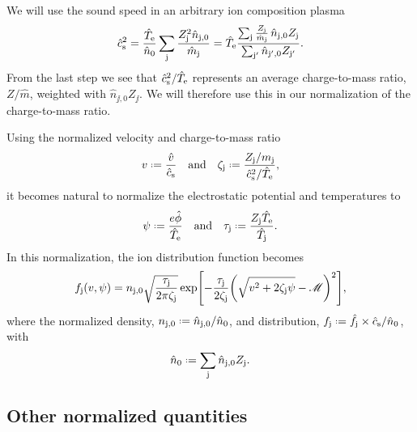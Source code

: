 \documentclass[11pt,a4paper, 
swedish, english %
]{article}
\begin{document}
We will use the sound speed in an arbitrary ion composition
plasma\footnotemark{} 
\begin{equation}
\hat{c}_{\text{s}}^2 = \frac{\hat{T}_{\mathrm{e}}}{\hat{n}_0}
\sum_{\mathrm{j}}\frac{Z_{\mathrm{j}}^2\hat{n}_{\mathrm{j},0}}{\hat{m}_{\mathrm{j}}}
=\hat{T}_{\mathrm{e}}\frac{\sum_{\mathrm{j}}\frac{Z_{\mathrm{j}}}{\hat{m}_{\mathrm{j}}}\,\hat{n}_{\mathrm{j},0}Z_{\mathrm{j}}}
{\sum_{\mathrm{j}'} \hat{n}_{\mathrm{j}',0}Z_{\mathrm{j}'}}.
\end{equation}
From the last step we see that $\hat{c}_{\text{s}}^2/\hat{T}_{\mathrm{e}}$ represents
an average charge-to-mass ratio, $Z/\hat{m}$, weighted with
$\hat{n}_{\jj,0}Z_{\jj}$. We will therefore use this in our
normalization of the charge-to-mass ratio.

Using the normalized velocity and charge-to-mass ratio
\begin{equation}
v \defeq \frac{\hat{v}}{\hcs}
\qand
\zeta_{\jj} \defeq \frac{Z_{\jj}/m_{\jj}}{\hcs^2/\hat{T}_{\ee}},
\end{equation}
it becomes natural to normalize the electrostatic potential and
temperatures to
\begin{equation}
\psi\defeq\frac{e\hat{\phi}}{\hat{T}_\ee}
\qand
\tau_\jj\defeq \frac{Z_{\jj}\hat{T}_{\ee}}{\hat{T}_{\jj}}.
\end{equation}
In this normalization, the ion distribution function becomes
\begin{equation}\label{eq:fj}
f_{\mathrm{j}}(v,\psi) = n_{\mathrm{j},0}\sqrt{\frac{\tau_{\mathrm{j}}}{2\pi\zeta_{\mathrm{j}}}}
\exp[-\frac{\tau_{\mathrm{j}}}{2\zeta_{\mathrm{j}}}\qty(\sqrt{v^2+2\zeta_{\mathrm{j}}\psi}-\mathscr{M})^2],
\end{equation}
where the normalized density,
$n_{\jj,0}\defeq\hat{n}_{\jj,0}/\hat{n}_{0}$, and distribution,
$f_{\jj}\defeq\hat{f}_{\jj}\times\hcs/\hat{n}_{0}$, with
\begin{equation}
\hat{n}_{0}\defeq\sum_{\jj} \hat{n}_{\jj,0}Z_{\jj}.
\end{equation}

\subsection{Other normalized quantities}
\end{document}
